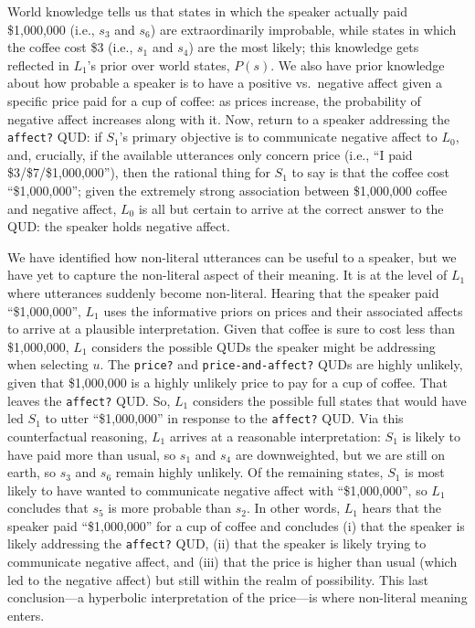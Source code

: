 \documentclass{sp}
\begin{document}
World knowledge tells us that states in which the speaker actually paid \$1,000,000 (i.e., $s_3$ and $s_6$) are extraordinarily improbable, while states in which the coffee cost \$3 (i.e., $s_1$ and $s_4$) are the most likely; this knowledge gets reflected in $L_1$'s prior over world states, $P(s)$. We also have prior knowledge about how probable a speaker is to have a positive vs.~negative affect given a specific price paid for a cup of coffee: as prices increase, the probability of negative affect increases along with it. Now, return to a speaker addressing the \texttt{affect?} QUD: if $S_1$'s primary objective is to communicate negative affect to $L_0$, and, crucially, if the available utterances only concern price (i.e., ``I paid \$3/\$7/\$1,000,000''), then the rational thing for $S_1$ to say is that the coffee cost ``\$1,000,000''; given the extremely strong association between \$1,000,000 coffee and negative affect, $L_0$ is all but certain to arrive at the correct answer to the QUD: the speaker holds negative affect.

We have identified how non-literal utterances can be useful to a speaker, but we have yet to capture the non-literal aspect of their meaning. It is at the level of $L_1$ where utterances suddenly become non-literal. Hearing that the speaker paid ``\$1,000,000'', $L_1$ uses the informative priors on prices and their associated affects to arrive at a plausible interpretation. Given that coffee is sure to cost less than \$1,000,000, $L_1$ considers the possible QUDs the speaker might be addressing when selecting $u$. The \texttt{price?} and \texttt{price-and-affect?} QUDs are highly unlikely, given that \$1,000,000 is a highly unlikely price to pay for a cup of coffee. That leaves the \texttt{affect?} QUD. So, $L_1$ considers the possible full states that would have led $S_1$ to utter ``\$1,000,000'' in response to the \texttt{affect?} QUD. Via this counterfactual reasoning, $L_1$ arrives at a reasonable interpretation: $S_1$ is likely to have paid more than usual, so $s_1$ and $s_4$ are downweighted, but we are still on earth, so $s_3$ and $s_6$ remain highly unlikely. Of the remaining states, $S_1$ is most likely to have wanted to communicate negative affect with ``\$1,000,000'', so $L_1$ concludes that $s_5$ is more probable than $s_2$. In other words, $L_1$ hears that the speaker paid ``\$1,000,000'' for a cup of coffee and concludes (i) that the speaker is likely addressing the \texttt{affect?} QUD, (ii) that the speaker is likely trying to communicate negative affect, and (iii) that the price is higher than usual (which led to the negative affect) but still within the realm of possibility. This last conclusion---a hyperbolic interpretation of the price---is where non-literal meaning enters.
\end{document}
